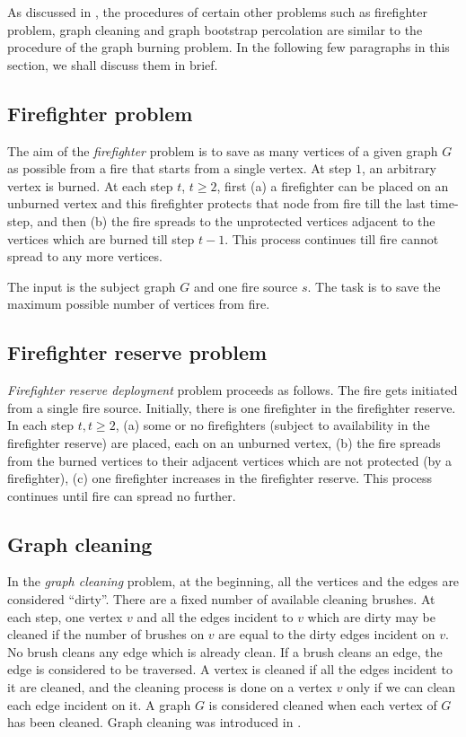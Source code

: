 As discussed in , the procedures of certain other problems such as firefighter problem, graph cleaning and graph bootstrap percolation are similar to the procedure of the graph burning problem. In the following few paragraphs in this section, we shall discuss them in brief.

\subsection{Firefighter problem}

The aim of the \textit{firefighter} problem \cite{Fomin2016} is to save as many vertices of a given graph $G$ as possible from a fire that starts from a single vertex. At step $1$, an arbitrary vertex is burned. At each step $t$, $t \geq 2$, first (a) a firefighter can be placed on an unburned vertex and this firefighter protects that node from fire till the last time-step, and then (b) the fire spreads to the unprotected vertices adjacent to the vertices which are burned till step $t-1$. This process continues till fire cannot spread to any more vertices.

The input is the subject graph $G$ and one fire source $s$. The task is to save the maximum possible number of vertices from fire.

\subsection{Firefighter reserve problem}

\textit{Firefighter reserve deployment} \cite{Fomin2016} problem proceeds as follows. The fire gets initiated from a single fire source. Initially, there is one firefighter in the firefighter reserve. In each step $t, t \geq 2$, (a) some or no firefighters (subject to availability in the firefighter reserve) are placed, each on an unburned vertex, (b) the fire spreads from the burned vertices to their adjacent vertices which are not protected (by a firefighter), (c) one firefighter increases in the firefighter reserve. This process continues until fire can spread no further.

\subsection{Graph cleaning}

In the \textit{graph cleaning} problem, at the beginning, all the vertices and the edges are considered ``dirty''. There are a fixed number of available cleaning brushes. At each step, one vertex $v$ and all the edges incident to $v$ which are dirty may be cleaned if the number of brushes on $v$ are equal to the dirty edges incident on $v$. No brush cleans any edge which is already clean. If a brush cleans an edge, the edge is considered to be traversed. A vertex is cleaned if all the edges incident to it are cleaned, and the cleaning process is done on a vertex $v$ only if we can clean each edge incident on it. A graph $G$ is considered cleaned when each vertex of $G$ has been cleaned. Graph cleaning was introduced in \cite{Mckeil2007,Messinger2008}.

